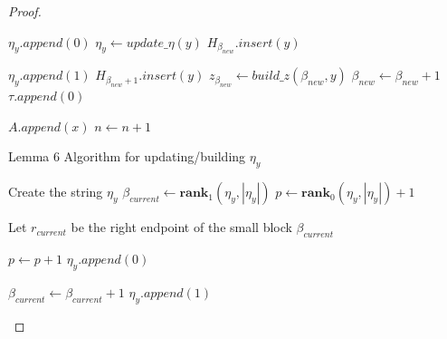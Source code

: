 \documentclass[runningheads]{llncs}
\begin{document}
\begin{proof}
\begin{algorithm}[H]
\begin{algorithmic}[1]

                \State $\eta_y.append(0)$
            \Else{}
                \State $\eta_y \gets update\_\eta(y) $
                \State $H_{\beta_{new}}.insert(y)$
            \EndIf
        \EndIf


                \State $\eta_y.append(1)$
                    \State $H_{\beta_{new}+1}.insert(y)$
                \EndIf
            \EndFor
            \State $z_{\beta_{new}} \gets build\_z(\beta_{new}, y)$
            \State $\beta_{new}\gets \beta_{new}+1$
            \State $\tau.append(0)$
        \EndIf

        \State $A.append(x)$
        \State $n\gets n+1$
        
        \EndFunction
        \end{algorithmic}
    \end{algorithm}




    \begin{algorithm}[H]
        \caption{Lemma 6 Algorithm for updating/building $\eta_{y}$}\label{lemma6eta}
        \begin{algorithmic}[1]
        
                \State Create the string $\eta_y$
            \EndIf
            \State $\beta_{current}\gets \textbf{rank}_{1}(\eta_{y}, |\eta_{y}|)$ 
            \State $p\gets \textbf{rank}_{0}(\eta_{y}, |\eta_{y}|)+1$
            

                \State Let $r_{current}$ be the right endpoint of the small block $\beta_{current}$
                
                    \State $p\gets p+1$
                    \State $\eta_{y}.append(0)$
                \EndIf
                
                \State $\beta_{current}\gets \beta_{current}+1$
                \State $\eta_{y}.append(1)$
            \EndWhile


\end{algorithmic}
\end{algorithm}
\end{proof}
\end{document}

